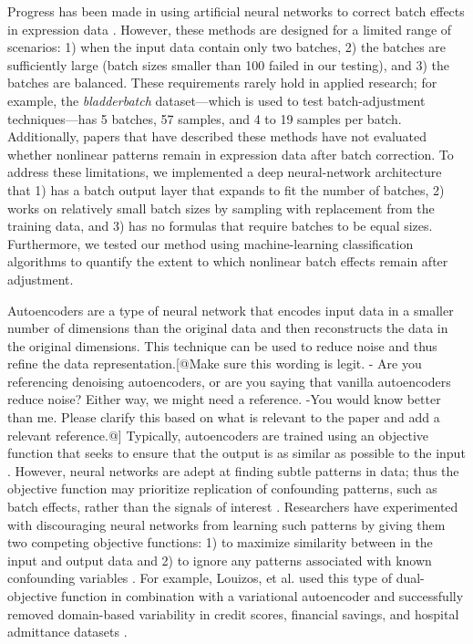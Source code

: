 \documentclass[11pt]{article}
\begin{document}
Progress has been made in using artificial neural networks to correct batch effects in expression data \cite{shaham_removal_2017,shaham_batch_2018,upadhyay_removal_2019}. %
However, these methods are designed for a limited range of scenarios:
1) when the input data contain only two batches,
2) the batches are sufficiently large (batch sizes smaller than 100 failed in our testing), and
3) the batches are balanced.
These requirements rarely hold in applied research; for example, the \textit{bladderbatch} dataset---which is used to test batch-adjustment techniques\cite{leek_bladderbatch_2017,leek_sva_2017}---has 5 batches, 57 samples, and 4 to 19 samples per batch.
Additionally, papers that have described these methods have not evaluated whether nonlinear patterns remain in expression data after batch correction.
To address these limitations, we implemented a deep neural-network architecture that 1) has a batch output layer that expands to fit
the number of batches, 2) works on relatively small batch sizes by sampling with replacement from the training data, and 3) has
no formulas that require batches to be equal sizes.
Furthermore, we tested our method using machine-learning classification algorithms to quantify the extent to which nonlinear batch effects remain after adjustment.

Autoencoders are a type of neural network that encodes input data in a smaller number of dimensions than the original data and then reconstructs the data in the original dimensions\citep{hinton_reducing_2006}.
This technique can be used to reduce noise and thus refine the data representation.[@Make sure this wording is legit. - Are you referencing denoising autoencoders, or are you saying that vanilla autoencoders reduce noise? Either way, we might need a reference. -You would know better than me. Please clarify this based on what is relevant to the paper and add a relevant reference.@]
Typically, autoencoders are trained using an objective function that seeks to ensure that the output is as similar as possible to the input \citep{hinton_reducing_2006}.
However, neural networks are adept at finding subtle patterns in data;
thus the objective function may prioritize replication of confounding patterns, such as batch effects, rather than the signals of interest \citep{ganin_domain-adversarial_2015,louizos_causal_2017-2}.
Researchers have experimented with discouraging neural networks from learning such patterns by giving them two competing objective functions: %
1) to maximize similarity between in the input and output data and
2) to ignore any patterns associated with known confounding variables \citep{ganin_domain-adversarial_2015,tzeng_deep_2014-2}.
For example, Louizos, et al. used this type of dual-objective function in combination with a variational autoencoder and successfully removed domain-based variability in credit scores, financial savings, and hospital admittance datasets \citet{louizos_variational_2015}.
\end{document}
